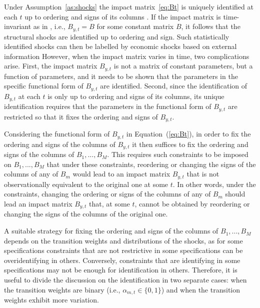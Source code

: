 \documentclass[nojss]{jss}
\begin{document}
Under Assumption~\ref{as:shocks} the impact matrix~\ref{eq:Bt} is uniquely identified at each $t$ up to ordering and signs of its columns \citep[Lemma~2]{Virolainen2:2024}. If the impact matrix is  time-invariant as in \cite{Lanne+Meitz+Saikkonen:2017}, i.e., $B_{y,t}=B$ for some constant matrix $B$, it follows that the structural shocks are identified up to ordering and sign. Such statistically identified shocks can then be labelled by economic shocks based on external information However, when the impact matrix varies in time, two complications arise. First, the impact matrix $B_{y,t}$ is not a matrix of constant parameters, but a function of parameters, and it needs to be shown that the parameters in the specific functional form of $B_{y,t}$ are identified. Second, since the identification of $B_{y,t}$ at each $t$ is only up to ordering and signs of its columns, its unique identification requires that the parameters in the functional form of $B_{y,t}$ are restricted so that it fixes the ordering and signs of $B_{y,t}$.

Considering the functional form of $B_{y,t}$ in Equation~(\ref{eq:Bt}), in order to fix the ordering and signs of the columns of $B_{y,t}$ it then suffices to fix the ordering and signs of the columns of $B_1,...,B_M$. This requires such constraints to be imposed on $B_1,...,B_M$ that under these constraints, reordering or changing the signs of the columns of any of $B_m$ would lead to an impact matrix $B_{y,t}$ that is not observationally equivalent to the original one at some $t$. In other words, under the constraints, changing the ordering or signs of the columns of any of $B_m$ should lead an impact matrix $B_{y,t}$ that, at some $t$, cannot be obtained by reordering or changing the signs of the columns of the original one.

A suitable strategy for fixing the ordering and signs of the columns of $B_1,...,B_M$ depends on the transition weights and distributions of the shocks, as for some specifications constraints that are not restrictive in some specifications can be overidentifying in others. Conversely, constraints that are identifying in some specifications may not be enough for identification in others. Therefore, it is useful to divide the discussion on the identification in two separate cases: when the transition weights are binary (i.e., $\alpha_{m,t}\in\lbrace 0, 1\rbrace$) and when the transition weights exhibit more variation.
\end{document}
